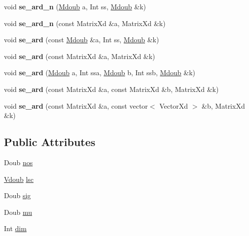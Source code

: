 \begin{DoxyCompactItemize}
\item 
\hypertarget{classpgpr__cov_ad9a0e147071aab11d5ebaa6d6ced36a3}{void {\bfseries se\+\_\+ard\+\_\+n} (\hyperlink{classpgpr__matrix}{Mdoub} a, Int ss, \hyperlink{classpgpr__matrix}{Mdoub} \&k)}\label{classpgpr__cov_ad9a0e147071aab11d5ebaa6d6ced36a3}

\item 
\hypertarget{classpgpr__cov_a0010820ae56e75fa83d5b1e7abd0000a}{void {\bfseries se\+\_\+ard\+\_\+n} (const Matrix\+Xd \&a, Matrix\+Xd \&k)}\label{classpgpr__cov_a0010820ae56e75fa83d5b1e7abd0000a}

\item 
\hypertarget{classpgpr__cov_af2024fa8c6102170cf34d7ba1fb4fdfa}{void {\bfseries se\+\_\+ard} (const \hyperlink{classpgpr__matrix}{Mdoub} \&a, Int ss, \hyperlink{classpgpr__matrix}{Mdoub} \&k)}\label{classpgpr__cov_af2024fa8c6102170cf34d7ba1fb4fdfa}

\item 
\hypertarget{classpgpr__cov_a06b9d31e23b59911a9f4713ddbebd690}{void {\bfseries se\+\_\+ard} (const Matrix\+Xd \&a, Matrix\+Xd \&k)}\label{classpgpr__cov_a06b9d31e23b59911a9f4713ddbebd690}

\item 
\hypertarget{classpgpr__cov_a041ee6574fd91bd9f22c98878e758163}{void {\bfseries se\+\_\+ard} (\hyperlink{classpgpr__matrix}{Mdoub} a, Int ssa, \hyperlink{classpgpr__matrix}{Mdoub} b, Int ssb, \hyperlink{classpgpr__matrix}{Mdoub} \&k)}\label{classpgpr__cov_a041ee6574fd91bd9f22c98878e758163}

\item 
\hypertarget{classpgpr__cov_a9685bceefac53c3328235a78ac11ab3a}{void {\bfseries se\+\_\+ard} (const Matrix\+Xd \&a, const Matrix\+Xd \&b, Matrix\+Xd \&k)}\label{classpgpr__cov_a9685bceefac53c3328235a78ac11ab3a}

\item 
\hypertarget{classpgpr__cov_a541b1f9166bb931fdf031989674e95b2}{void {\bfseries se\+\_\+ard} (const Matrix\+Xd \&a, const vector$<$ Vector\+Xd $>$ \&b, Matrix\+Xd \&k)}\label{classpgpr__cov_a541b1f9166bb931fdf031989674e95b2}

\end{DoxyCompactItemize}
\subsection*{Public Attributes}
\begin{DoxyCompactItemize}
\item 
Doub \hyperlink{classpgpr__cov_aca7d95563680510edbd84957b34da53c}{nos}
\item 
\hyperlink{classpgpr__vector}{Vdoub} \hyperlink{classpgpr__cov_a43428fdb9c6278e5e2be3a4c60967b7b}{lsc}
\item 
Doub \hyperlink{classpgpr__cov_a57b97be1a56d01ba78bb58200cc66244}{sig}
\item 
Doub \hyperlink{classpgpr__cov_ad57517c36c587894616f19bd02025747}{mu}
\item 
Int \hyperlink{classpgpr__cov_ab24ca5303c1a5e6865109a8e1ba32f0f}{dim}
\end{DoxyCompactItemize}


